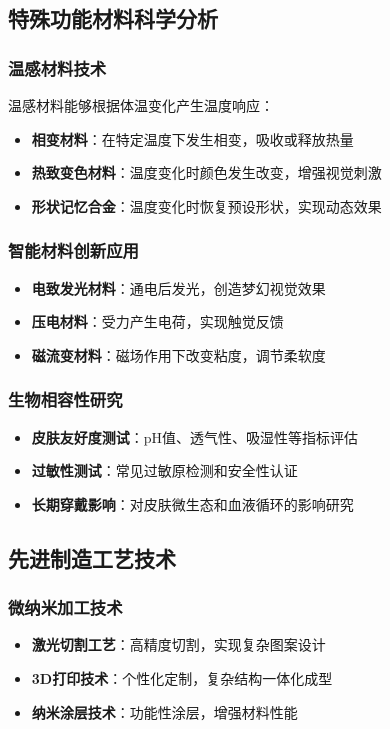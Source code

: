 \documentclass[12pt,UTF8]{ctexbook}
\begin{document}
\subsection{特殊功能材料科学分析}
\subsubsection{温感材料技术}
温感材料能够根据体温变化产生温度响应：
\begin{itemize}[leftmargin=2cm]
	\item \textbf{相变材料}：在特定温度下发生相变，吸收或释放热量
	\item \textbf{热致变色材料}：温度变化时颜色发生改变，增强视觉刺激
	\item \textbf{形状记忆合金}：温度变化时恢复预设形状，实现动态效果
\end{itemize}

\subsubsection{智能材料创新应用}
\begin{itemize}[leftmargin=2cm]
	\item \textbf{电致发光材料}：通电后发光，创造梦幻视觉效果
	\item \textbf{压电材料}：受力产生电荷，实现触觉反馈
	\item \textbf{磁流变材料}：磁场作用下改变粘度，调节柔软度
\end{itemize}

\subsubsection{生物相容性研究}
\begin{itemize}[leftmargin=2cm]
	\item \textbf{皮肤友好度测试}：pH值、透气性、吸湿性等指标评估
	\item \textbf{过敏性测试}：常见过敏原检测和安全性认证
	\item \textbf{长期穿戴影响}：对皮肤微生态和血液循环的影响研究
\end{itemize}

\subsection{先进制造工艺技术}
\subsubsection{微纳米加工技术}
\begin{itemize}[leftmargin=2cm]
	\item \textbf{激光切割工艺}：高精度切割，实现复杂图案设计
	\item \textbf{3D打印技术}：个性化定制，复杂结构一体化成型
	\item \textbf{纳米涂层技术}：功能性涂层，增强材料性能
\end{itemize}
\end{document}
